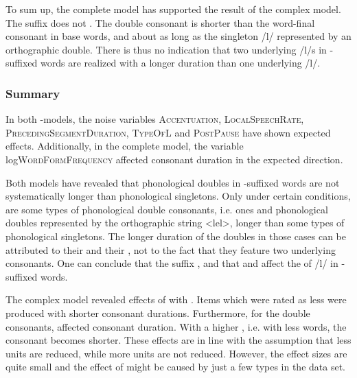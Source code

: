 To sum up, the complete model has supported the result of the complex model. The suffix  does not . The double consonant is shorter than the word-final consonant in base words, and about as long as the singleton /l/ represented by an orthographic double. There is thus no indication that two underlying /l/s in -suffixed words are realized with a longer duration than one underlying /l/.




\subsubsection{Summary} \label{ly experiment summary}

In both -models, the noise variables \textsc{Accentuation}, \textsc{LocalSpeechRate}, \textsc{PrecedingSegmentDuration}, \textsc{TypeOfL} and \textsc{PostPause} have shown expected effects. Additionally, in the complete model, the variable log\textsc{WordFormFrequency} affected consonant duration in the expected direction.

Both models have revealed that phonological doubles in -suffixed words are not systematically longer than phonological singletons. Only under certain conditions, are some types of phonological double consonants, i.e.  ones and phonological doubles represented by the orthographic string <lel>, longer than some types of phonological singletons. The longer duration of the doubles in those cases can be attributed to their  and their , not to the fact that they feature two underlying consonants. 
One can conclude that the suffix  , and that  and  affect the  of /l/ in -suffixed words. 

The complex model revealed effects of  with . Items which were rated as less  were produced with shorter consonant durations. Furthermore, for the  double consonants,  affected consonant duration. With a higher , i.e. with less  words, the consonant becomes shorter. 
These effects are in line with the assumption that less  units are reduced, while more  units are not reduced. However, the effect sizes are quite small and the effect of  might be caused by just a few types in the data set. 

